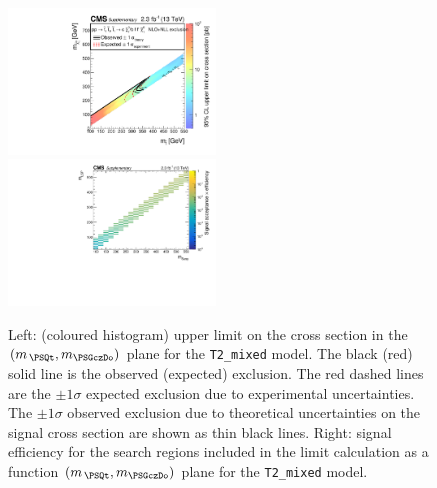 \clearpage
\begin{figure}[!h]
  \begin{center}
    \includegraphics[width=0.49\textwidth]{RA1T2mixedXSEC_aux} \, 
    \includegraphics[width=0.49\textwidth]{T2mixed_merging_4_cats_aux} \,     
  \end{center}
  \caption{Left: (coloured histogram) upper limit on the cross section in the $(m_{\,\PSQt}, m_{\PSGczDo})$ plane for the \texttt{T2\_mixed} model. 
  The black (red) solid line is the observed (expected) exclusion. The red dashed lines are the $\pm1\sigma$ expected exclusion due to experimental uncertainties. 
  The $\pm1\sigma$ observed exclusion due to theoretical uncertainties on the signal cross section are shown as thin black lines. 
  Right: signal efficiency for the search regions included in the limit calculation as a function $(m_{\,\PSQt}, m_{\PSGczDo})$ plane for the \texttt{T2\_mixed} model. 
  \label{fig:T2mixed_excl}}
\end{figure}



